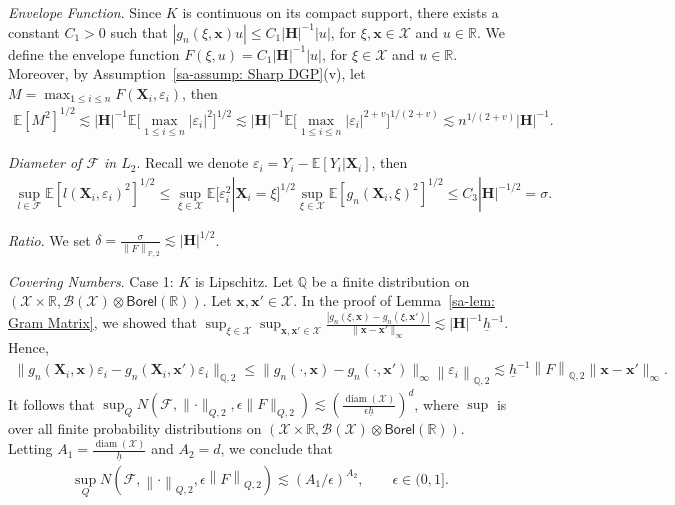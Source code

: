 \documentclass[10pt]{article}
\DeclareMathOperator{\diam}{diam}
\renewcommand{\P}{\mathbb{P}}
\newcommand{\E}{\mathbb{E}}
\newcommand{\reals}{\mathbb{R}}
\newcommand{\norm}[1]{\left\lVert#1\right\rVert}
\newcommand{\infnorm}[1]{\lVert #1 \rVert_{\infty}}
\newcommand{\bH}{\mathbf{H}}
\newcommand{\bx}{\mathbf{x}}
\newcommand{\bX}{\mathbf{X}}
\newcommand{\B}{\mathcal{B}}
\newcommand{\F}{\mathcal{F}}
\newcommand{\X}{\mathcal{X}}
\newcommand{\px}{\mathbf{x}'}
\begin{document}
\medskip\textit{Envelope Function}. Since $K$ is continuous on its compact support, there exists a constant $C_1 > 0$ such that $|g_n(\xi,\bx)u| \leq C_1 |\bH|^{-1} |u|$, for $\xi, \bx \in \X$ and $ u \in \reals$. We define the envelope function $F(\xi, u) = C_1 |\bH|^{-1}|u|$, for $\xi \in \X$ and $ u \in \reals$. Moreover, by Assumption~\ref{sa-assump: Sharp DGP}(v), let $M = \max_{1 \leq i \leq n} F(\bX_i, \varepsilon_i)$, then
\begin{align*}
    \E[M^2]^{1/2}
    \lesssim |\bH|^{-1} \E \big[\max_{1 \leq i \leq n} |\varepsilon_i|^2 \big]^{1/2}
    \lesssim |\bH|^{-1} \E \big[\max_{1 \leq i \leq n} |\varepsilon_i|^{2+v}\big]^{1/(2+v)}
    \lesssim n^{1/(2+v)} |\bH|^{-1}.
\end{align*}

\medskip\textit{Diameter of $\F$ in $L_2$}. Recall we denote $\varepsilon_i = Y_i - \E[Y_i|\bX_i]$, then
\begin{align*}
    \sup_{l \in \mathcal{F}} \E[l(\bX_i, \varepsilon_i)^2]^{1/2}
    \leq \sup_{\xi \in \X} \E[\varepsilon_i^2 | \bX_i = \xi]^{1/2} \sup_{\xi \in \X} \E[g_n(\bX_i, \xi)^2]^{1/2} \leq C_3 |\bH|^{-1/2}
    = \sigma.
\end{align*}

\medskip\textit{Ratio}. We set $\delta = \frac{\sigma}{\norm{F}_{\P,2}} \lesssim |\bH|^{1/2}$.

\medskip\textit{Covering Numbers}. Case 1: $K$ is Lipschitz. Let $\mathbb{Q}$ be a finite distribution on $(\X \times \reals, \B(\X) \otimes \mathsf{Borel}(\reals))$. Let $\bx, \bx' \in \X$. In the proof of Lemma~\ref{sa-lem: Gram Matrix}, we showed that $\sup_{\xi \in \mathcal{X}} \sup_{\bx, \bx' \in \X } \frac{|g_n(\xi,\bx) - g_n(\xi, \bx')|}{\infnorm{\bx - \bx'}} \lesssim |\bH|^{-1}\underline h^{-1}$. Hence,
\begin{align*}
    \| g_n(\bX_i, \bx) \varepsilon_i - g_n(\bX_i, \bx')\varepsilon_i \|_{\mathbb{Q},2}
    \leq \infnorm{g_n(\cdot, \bx) - g_n(\cdot,\bx')} \norm{\varepsilon_i}_{\mathbb{Q},2}
    \lesssim \underline h^{-1} \norm{F}_{\mathbb{Q},2} \infnorm{\bx- \px}.
\end{align*}
It follows that $\sup_{Q} N(\F, \lVert \cdot \rVert_{Q,2}, \epsilon \| F \|_{Q,2}) \lesssim (\frac{\diam(\X)}{\epsilon \underline h})^d$, where $\sup$ is over all finite probability distributions on $(\X \times \reals, \B(\X) \otimes \mathsf{Borel}(\reals))$. Letting $A_1 = \frac{\diam(\X)}{\underline h}$ and $ A_2 = d$, we conclude that
\begin{align*}
    \sup_Q N(\F, \norm{\cdot}_{Q,2}, \epsilon \norm{F}_{Q,2}) \lesssim (A_1/\epsilon)^{A_2}, \qquad \epsilon \in (0,1].
\end{align*}
\end{document}
